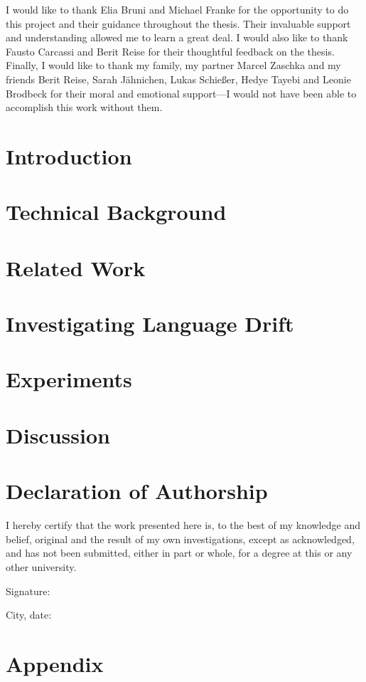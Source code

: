 \documentclass[11pt, twoside, openright]{report} %
\begin{document}
I would like to thank Elia Bruni and Michael Franke for the opportunity to do this project and their guidance throughout the thesis. Their invaluable support and understanding allowed me to learn a great deal. I would also like to thank Fausto Carcassi and Berit Reise for their thoughtful feedback on the thesis.
Finally, I would like to thank my family, my partner Marcel Zaschka and my friends Berit Reise, Sarah J\"ahnichen, Lukas Schießer, Hedye Tayebi and Leonie Brodbeck for their moral and emotional support---I would not have been able to accomplish this work without them.

\tableofcontents

\chapter{Introduction}
\label{chapter01}


 \chapter{Technical Background}
 \label{chapter02}
 
 
\chapter{Related Work}
\label{chapter03}


\chapter{Investigating Language Drift}
\label{chapter04}


\chapter{Experiments}
\label{chapter05}


\chapter{Discussion}
\label{chapter06}


\chapter*{Declaration of Authorship}
I hereby certify that the work presented here is, to the best of my knowledge and belief, original and the result of my own investigations, except as acknowledged, and has not been submitted, either in part or whole, for a degree at this or any other university.

\vspace{2cm}
Signature:~\makebox[3in]{\hrulefill}

\vspace{1cm}
City, date:~\makebox[3in]{\hrulefill} 

\appendix
\chapter{Appendix}	
\label{appendix}


\printbibliography
%
\end{document}
